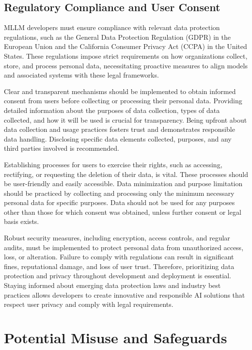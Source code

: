 \subsection{Regulatory Compliance and User Consent}

MLLM developers must ensure compliance with relevant data protection regulations, such as the General Data Protection Regulation (GDPR) in the European Union and the California Consumer Privacy Act (CCPA) in the United States. These regulations impose strict requirements on how organizations collect, store, and process personal data, necessitating proactive measures to align models and associated systems with these legal frameworks. 

Clear and transparent mechanisms should be implemented to obtain informed consent from users before collecting or processing their personal data. Providing detailed information about the purposes of data collection, types of data collected, and how it will be used is crucial for transparency. Being upfront about data collection and usage practices fosters trust and demonstrates responsible data handling. Disclosing specific data elements collected, purposes, and any third parties involved is recommended.

Establishing processes for users to exercise their rights, such as accessing, rectifying, or requesting the deletion of their data, is vital. These processes should be user-friendly and easily accessible. Data minimization and purpose limitation should be practiced by collecting and processing only the minimum necessary personal data for specific purposes. Data should not be used for any purposes other than those for which consent was obtained, unless further consent or legal basis exists.

Robust security measures, including encryption, access controls, and regular audits, must be implemented to protect personal data from unauthorized access, loss, or alteration. Failure to comply with regulations can result in significant fines, reputational damage, and loss of user trust. Therefore, prioritizing data protection and privacy throughout development and deployment is essential. Staying informed about emerging data protection laws and industry best practices allows developers to create innovative and responsible AI solutions that respect user privacy and comply with legal requirements.

\section{Potential Misuse and Safeguards}

